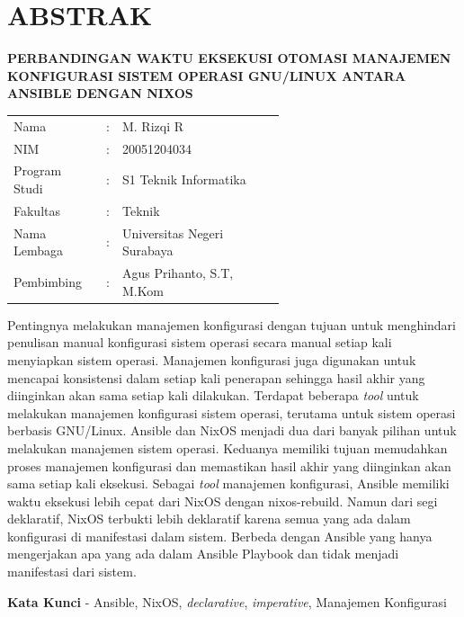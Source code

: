 \documentclass[10pt,]{report}
\begin{document}
\chapter*{ABSTRAK}
\begin{adjustwidth}{0.0cm}{}
	\begin{center}
		\textbf{PERBANDINGAN WAKTU EKSEKUSI OTOMASI MANAJEMEN KONFIGURASI SISTEM OPERASI GNU/LINUX ANTARA ANSIBLE DENGAN NIXOS}
	\end{center}
	\medskip
	\begin{adjustwidth}{0.0cm}{}
		\begin{tabular}{@{}lcp{0.6\linewidth}}
			Nama          & : & M. Rizqi R                  \\
			NIM           & : & 20051204034                 \\
			Program Studi & : & S1 Teknik Informatika       \\
			Fakultas      & : & Teknik                      \\
			Nama Lembaga  & : & Universitas Negeri Surabaya \\
			Pembimbing    & : & Agus Prihanto, S.T, M.Kom   \\
		\end{tabular}
	\end{adjustwidth}
	\medskip

	Pentingnya melakukan manajemen konfigurasi dengan tujuan untuk menghindari
	penulisan manual konfigurasi sistem operasi secara manual setiap kali
	menyiapkan sistem operasi. Manajemen konfigurasi juga digunakan untuk
	mencapai konsistensi dalam setiap kali penerapan sehingga hasil akhir yang
	diinginkan akan sama setiap kali dilakukan. Terdapat beberapa \textit{tool}
	untuk melakukan manajemen konfigurasi sistem operasi, terutama untuk sistem
	operasi berbasis GNU/Linux. Ansible dan NixOS menjadi dua dari banyak pilihan
	untuk melakukan manajemen sistem operasi. Keduanya memiliki tujuan memudahkan
	proses manajemen konfigurasi dan memastikan hasil akhir yang diinginkan akan
	sama setiap kali eksekusi. Sebagai \textit{tool} manajemen konfigurasi,
	Ansible memiliki waktu eksekusi lebih cepat dari NixOS dengan nixos-rebuild.
	Namun dari segi deklaratif, NixOS terbukti lebih deklaratif karena semua yang
	ada dalam konfigurasi di manifestasi dalam sistem. Berbeda dengan Ansible
	yang hanya mengerjakan apa yang ada dalam Ansible Playbook dan tidak menjadi
	manifestasi dari sistem.
	\medskip

	\noindent\textbf{Kata Kunci} - Ansible, NixOS, \textit{declarative}, \textit{imperative},
	Manajemen Konfigurasi
\end{adjustwidth}
\newpage
\end{document}
